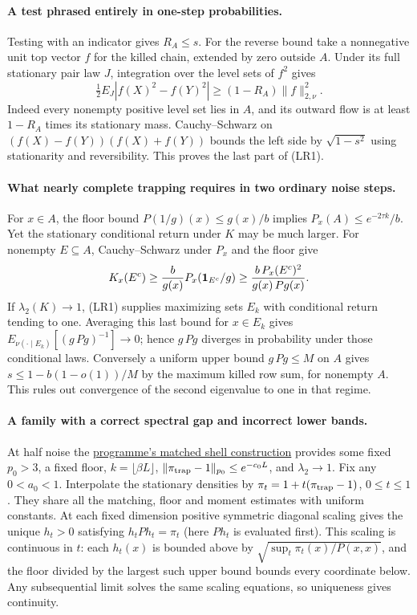 \paragraph{A test phrased entirely in one-step probabilities.}
Testing with an indicator gives $R_A\le s$. For the reverse bound take a
nonnegative unit top vector $f$ for the killed chain, extended by zero
outside $A$. Under its full stationary pair law $J$, integration over the
level sets of $f^2$ gives
\[
 \tfrac12 E_J|f(X)^2-f(Y)^2|\ge(1-R_A)\|f\|_{2,\nu}^2.
\]
Indeed every nonempty positive level set lies in $A$, and its outward
flow is at least $1-R_A$ times its stationary mass. Cauchy--Schwarz on
$(f(X)-f(Y))(f(X)+f(Y))$ bounds the left side by $\sqrt{1-s^2}$
using stationarity and reversibility. This proves the last part of (LR1).

\paragraph{What nearly complete trapping requires in two ordinary noise steps.}
For $x\in A$, the floor bound $P(1/g)(x)\le g(x)/b$ implies
$P_x(A)\le e^{-2\tau k}/b$. Yet the stationary conditional return under
$K$ may be much larger. For nonempty $E\subseteq A$, Cauchy--Schwarz
under $P_x$ and the floor give
\[
 K_x(E^c)\ge {b\over g(x)}P_x({\bf1}_{E^c}/g)
 \ge {b\,P_x(E^c)^2\over g(x)\,Pg(x)} .
\]
If $\lambda_2(K)\to1$, (LR1) supplies maximizing sets $E_k$ with
conditional return tending to one. Averaging this last bound for $x\in E_k$
gives $E_{\nu(\cdot\mid E_k)}[(g\,Pg)^{-1}]\to0$; hence $g\,Pg$ diverges
in probability under those conditional laws. Conversely a uniform upper
bound $g\,Pg\le M$ on $A$ gives $s\le1-b(1-o(1))/M$ by the maximum
killed row sum, for nonempty $A$. This rules out convergence of the
second eigenvalue to one in that regime.

\paragraph{A family with a correct spectral gap and incorrect lower bands.}
At half noise the
\href{https://github.com/lluiseriksson/THE-ERIKSSON-PROGRAMME/blob/7ac6acd4fe2dcf992c6acc11eb406b8a8323d7c3/papers/stationary-weighting354/research/2026-11-18-small-support/ALL-CORRELATIONS-SHELL-TRAP.md}{programme's matched shell construction}
provides some fixed $p_0>3$, a fixed floor, $k=\lfloor\beta L\rfloor$,
$\|\pi_{\rm trap}-1\|_{p_0}\le e^{-c_0 L}$, and $\lambda_2\to1$.
Fix any $0<a_0<1$. Interpolate the stationary densities by
$\pi_t=1+t(\pi_{\rm trap}-1)$, $0\le t\le1$. They share all the matching,
floor and moment estimates with uniform constants. At each fixed dimension
positive symmetric diagonal scaling gives the unique $h_t>0$ satisfying
$h_t P h_t=\pi_t$ (here $P h_t$ is evaluated first). This scaling is
continuous in $t$: each $h_t(x)$ is bounded above by
$\sqrt{\sup_t\pi_t(x)/P(x,x)}$, and the floor divided by the largest such
upper bound bounds every coordinate below. Any subsequential limit solves
the same scaling equations, so uniqueness gives continuity.

